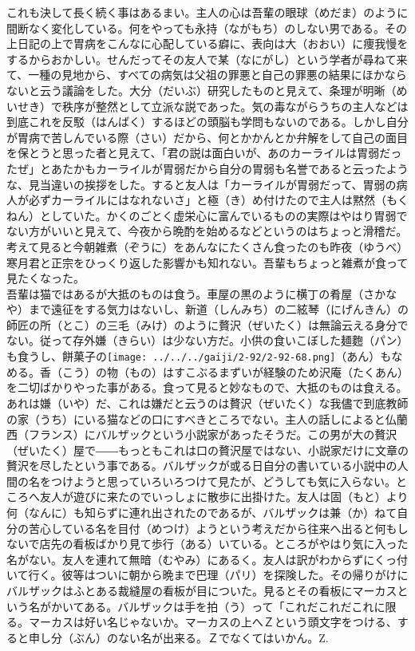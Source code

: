 \documentclass{book}
\begin{document}
これも決して長く続く事はあるまい。主人の心は吾輩の眼球（めだま）のように間断なく変化している。何をやっても永持（ながもち）のしない男である。その上日記の上で胃病をこんなに心配している癖に、表向は大（おおい）に痩我慢をするからおかしい。せんだってその友人で某（なにがし）という学者が尋ねて来て、一種の見地から、すべての病気は父祖の罪悪と自己の罪悪の結果にほかならないと云う議論をした。大分（だいぶ）研究したものと見えて、条理が明晰（めいせき）で秩序が整然として立派な説であった。気の毒ながらうちの主人などは到底これを反駁（はんばく）するほどの頭脳も学問もないのである。しかし自分が胃病で苦しんでいる際（さい）だから、何とかかんとか弁解をして自己の面目を保とうと思った者と見えて、「君の説は面白いが、あのカーライルは胃弱だったぜ」とあたかもカーライルが胃弱だから自分の胃弱も名誉であると云ったような、見当違いの挨拶をした。すると友人は「カーライルが胃弱だって、胃弱の病人が必ずカーライルにはなれないさ」と極（き）め付けたので主人は黙然（もくねん）としていた。かくのごとく虚栄心に富んでいるものの実際はやはり胃弱でない方がいいと見えて、今夜から晩酌を始めるなどというのはちょっと滑稽だ。考えて見ると今朝雑煮（ぞうに）をあんなにたくさん食ったのも昨夜（ゆうべ）寒月君と正宗をひっくり返した影響かも知れない。吾輩もちょっと雑煮が食って見たくなった。\\
吾輩は猫ではあるが大抵のものは食う。車屋の黒のように横丁の肴屋（さかなや）まで遠征をする気力はないし、新道（しんみち）の二絃琴（にげんきん）の師匠の所（とこ）の三毛（みけ）のように贅沢（ぜいたく）は無論云える身分でない。従って存外嫌（きらい）は少ない方だ。小供の食いこぼした麺麭（パン）も食うし、餅菓子の\texttt{[image: ../../../gaiji/2-92/2-92-68.png]}（あん）もなめる。香（こう）の物（もの）はすこぶるまずいが経験のため沢庵（たくあん）を二切ばかりやった事がある。食って見ると妙なもので、大抵のものは食える。あれは嫌（いや）だ、これは嫌だと云うのは贅沢（ぜいたく）な我儘で到底教師の家（うち）にいる猫などの口にすべきところでない。主人の話しによると仏蘭西（フランス）にバルザックという小説家があったそうだ。この男が大の贅沢（ぜいたく）屋で――もっともこれは口の贅沢屋ではない、小説家だけに文章の贅沢を尽したという事である。バルザックが或る日自分の書いている小説中の人間の名をつけようと思っていろいろつけて見たが、どうしても気に入らない。ところへ友人が遊びに来たのでいっしょに散歩に出掛けた。友人は固（もと）より何（なんに）も知らずに連れ出されたのであるが、バルザックは兼（か）ねて自分の苦心している名を目付（めつけ）ようという考えだから往来へ出ると何もしないで店先の看板ばかり見て歩行（ある）いている。ところがやはり気に入った名がない。友人を連れて無暗（むやみ）にあるく。友人は訳がわからずにくっ付いて行く。彼等はついに朝から晩まで巴理（パリ）を探険した。その帰りがけにバルザックはふとある裁縫屋の看板が目についた。見るとその看板にマーカスという名がかいてある。バルザックは手を拍（う）って「これだこれだこれに限る。マーカスは好い名じゃないか。マーカスの上へＺという頭文字をつける、すると申し分（ぶん）のない名が出来る。Ｚでなくてはいかん。Z.
\end{document}
